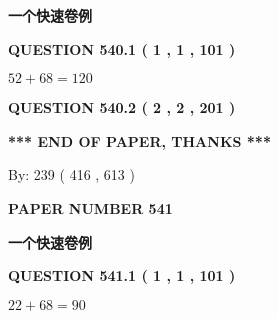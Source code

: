 \documentclass{ctexart}
\begin{document}
   
   
   
 \vspace{0.2in}
{\LARGE {\textbf{ 一个快速卷例}}}
   
   
  
\vspace{0.2in}
  
{\textbf{\Large{QUESTION
540.1 
 ( 1 , 1 , 101 )
}}}
  
  
 
 

$ %
52 +  %
68=   %
120$
 
 
  
\vspace{0.2in}
  
{\textbf{\Large{QUESTION
540.2 
 ( 2 , 2 , 201 )
}}}
  
  
   
   
 \vspace{0.2in}
 
   
   
   
   
\vspace{1.0in} 
{\textbf{\large{ *** END OF PAPER, THANKS *** }}} 
   
   
\hspace{1.0in} By: 
 239 ( 416 ,  613 )
   
   
   
   
\newpage 
\setcounter{page}{ 
   541001 } 
   
   
   
   
 {\textbf{ \Large{ PAPER NUMBER  541  }}}
   
   
\vspace{0.2in}
   
   
   
   
   
   
 \vspace{0.2in}
{\LARGE {\textbf{ 一个快速卷例}}}
   
   
  
\vspace{0.2in}
  
{\textbf{\Large{QUESTION
541.1 
 ( 1 , 1 , 101 )
}}}
  
  
 
 

$ %
22 +  %
68=   %
90$
 
 
  
\vspace{0.2in}
  
\end{document}
